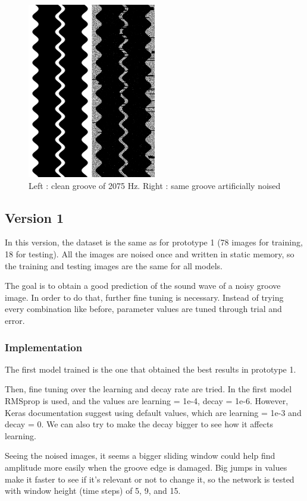 \documentclass[12pt, twoside]{article}
\begin{document}
\begin{figure}
	\centering
	\includegraphics[width=0.5\textwidth]{../images/cleannoisy.png}
	\caption{Left : clean groove of 2075 Hz. Right : same groove artificially noised}
	\label{cleannoisy}
\end{figure}

\subsection{Version 1}
In this version, the dataset is the same as for prototype 1 (78 images for training, 18 for testing). All the images are noised once and written in static memory, so the training and testing images are the same for all models.

The goal is to obtain a good prediction of the sound wave of a noisy groove image. In order to do that, further fine tuning is necessary.
Instead of trying every combination like before, parameter values are tuned through trial and error.
\subsubsection{Implementation}
The first model trained is the one that obtained the best results in prototype 1.

Then, fine tuning over the learning and decay rate are tried. In the first model RMSprop is used, and the values are learning = 1e-4, decay = 1e-6. However, Keras documentation suggest using default values, which are learning = 1e-3 and decay = 0. We can also try to make the decay bigger to see how it affects learning.

Seeing the noised images, it seems a bigger sliding window could help find amplitude more easily when the groove edge is damaged. Big jumps in values make it faster to see if it's relevant or not to change it, so the network is tested with window height (time steps) of 5, 9, and 15.
\end{document}
